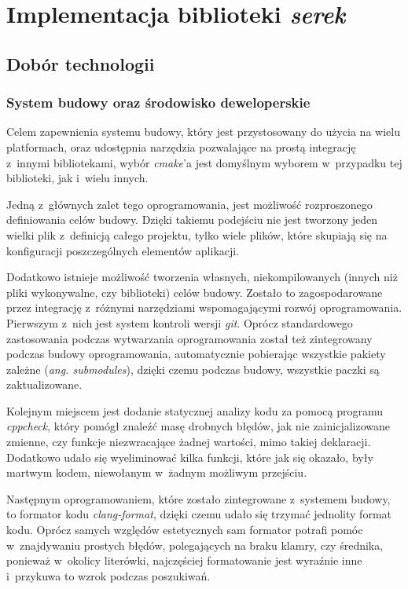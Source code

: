 \documentclass[12pt]{article}
\newcommand{\n}{\newline}
\newcommand{\nonpl}[1]{{\it #1}}
\newcommand{\ang}[1]{\nonpl{ang. #1}}
\newcommand{\serek}{\nonpl{serek}}
\begin{document}
	{
		\section{Implementacja biblioteki \serek}\label{serek}

		{
			\subsection{Dobór technologii}

			{
				\subsubsection{System budowy oraz środowisko deweloperskie}

				Celem zapewnienia systemu budowy, który jest przystosowany do użycia na wielu platformach, oraz udostępnia narzędzia pozwalające na prostą
				integrację z~innymi bibliotekami, wybór \nonpl{cmake}'a\cite{cmake_docs} jest domyślnym wyborem w~przypadku tej biblioteki, jak i~wielu innych.\n

				Jedną z~głównych zalet tego oprogramowania, jest możliwość rozproszonego definiowania celów budowy. Dzięki takiemu podejściu nie jest tworzony
				jeden wielki plik z~definicją całego projektu, tylko wiele plików, które skupiają się na konfiguracji poszczególnych elementów aplikacji.\n

				Dodatkowo istnieje możliwość tworzenia własnych, niekompilowanych (innych niż pliki wykonywalne, czy biblioteki) celów budowy. Zostało to zagospodarowane
				przez integrację z~różnymi narzędziami wspomagającymi rozwój oprogramowania. Pierwszym z~nich jest system kontroli wersji \nonpl{git}\cite{git_docs}. Oprócz standardowego
				zastosowania podczas wytwarzania oprogramowania został też zintegrowany podczas budowy oprogramowania, automatycznie pobierając wszystkie pakiety zależne
				(\ang{submodules}), dzięki czemu podczas budowy, wszystkie paczki są zaktualizowane.\n

				Kolejnym miejscem jest dodanie statycznej analizy kodu za pomocą programu \nonpl{cppcheck}\cite{cppcheck_repo}, który pomógł znaleźć masę drobnych błędów,
				jak nie zainicjalizowane zmienne, czy funkcje niezwracające żadnej wartości, mimo takiej deklaracji. Dodatkowo udało się wyeliminować kilka funkcji,
				które jak się okazało, były martwym kodem, niewołanym w~żadnym możliwym przejściu.\n

				Następnym oprogramowaniem, które zostało zintegrowane z~systemem budowy, to formator kodu \nonpl{clang-format}\cite{clangformat_docs}, dzięki czemu
				udało się trzymać jednolity format kodu. Oprócz samych względów estetycznych sam formator potrafi pomóc w~znajdywaniu prostych błędów, polegających
				na braku klamry, czy średnika, ponieważ w~okolicy literówki, najczęściej formatowanie jest wyraźnie inne i~przykuwa to wzrok podczas poszukiwań.\n

}}}
\end{document}
